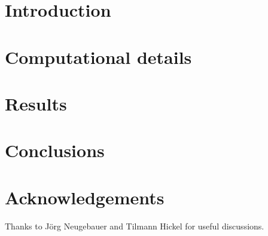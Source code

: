 

\title{\titletext}



    \maketitle

    \section{Introduction}
        \label{sec:introduction}
        

    \section{Computational details}
        \label{sec:computational}
        

    \section{Results}
        \label{sec:results}
        

    \section{Conclusions}
        \label{sec:conclusions}
        

    \section*{Acknowledgements}
        \label{sec:acknowledgement}
        Thanks to J\"org Neugebauer and Tilmann Hickel for useful discussions.

    
    

